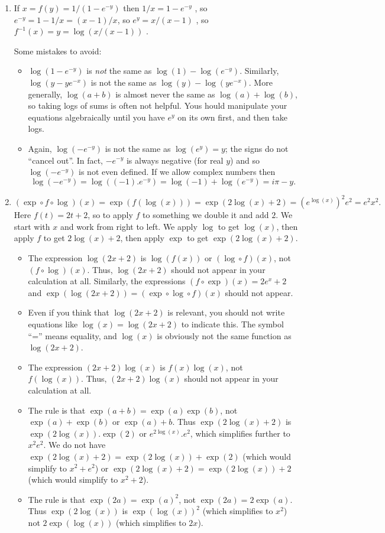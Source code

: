 \documentclass{amsart}
\renewcommand{\:}       {\colon}
\newcommand{\mk}        {}
\begin{document}
\begin{enumerate}
 \item %
  If $x=f(y)=1/(1-e^{-y})$ \mk then $1/x=1-e^{-y}$ \mk, so
  $e^{-y}=1-1/x=(x-1)/x$, so $e^y=x/(x-1)$ \mk, so
  $f^{-1}(x)=y=\log(x/(x-1))$ \mk. 

  Some mistakes to avoid:
  \begin{itemize}
   \item $\log(1-e^{-y})$ is \emph{not} the same as
    $\log(1)-\log(e^{-y})$.  Similarly, $\log(y-ye^{-x})$ is not the
    same as $\log(y)-\log(ye^{-x})$.  More generally, $\log(a+b)$ is
    almost never the same as $\log(a)+\log(b)$, so taking logs of sums
    is often not helpful.  Yous hould manipulate your equations
    algebraically until you have $e^y$ on its own first, and then take
    logs. 
   \item Again, $\log(-e^{-y})$ is not the same as $\log(e^y)=y$; the
    signs do not ``cancel out''.  In fact, $-e^{-y}$ is always
    negative (for real $y$) and so $\log(-e^{-y})$ is not even
    defined.  If we allow complex numbers then 
    \[ \log(-e^{-y}) = \log((-1).e^{-y}) = 
        \log(-1) + \log(e^{-y}) = i\pi - y.
    \]
  \end{itemize}

 \item %
  \[ (\exp\circ f\circ\log)(x) = \exp(f(\log(x))) \mk = 
      \exp(2\log(x)+2) \mk = (e^{\log(x)})^2 e^2 \mk = e^2x^2 \mk.
  \]
  Here $f(t)=2t+2$, so to apply $f$ to something we double it and add
  $2$.  We start with $x$ and work from right to left.  We apply
  $\log$ to get $\log(x)$, then apply $f$ to get $2\log(x)+2$, then
  apply $\exp$ to get $\exp(2\log(x)+2)$.  
  \begin{itemize}
   \item The expression $\log(2x+2)$ is $\log(f(x))$ or
    $(\log\circ f)(x)$, not $(f\circ\log)(x)$.  Thus, $\log(2x+2)$
    should not appear in your calculation at all.  Similarly, the
    expressions $(f\circ\exp)(x)=2e^x+2$ and
    $\exp(\log(2x+2))=(\exp\circ\log\circ f)(x)$ should not appear.
   \item Even if you think that $\log(2x+2)$ is relevant, you should
    not write equations like $\log(x)=\log(2x+2)$ to indicate this.
    The symbol ``='' means equality, and $\log(x)$ is obviously not
    the same function as $\log(2x+2)$.
   \item The expression $(2x+2)\log(x)$ is $f(x)\log(x)$, not
    $f(\log(x))$.  Thus, $(2x+2)\log(x)$ should not appear in your
    calculation at all.
   \item The rule is that $\exp(a+b)=\exp(a)\exp(b)$, not
    $\exp(a)+\exp(b)$ or $\exp(a)+b$.  Thus $\exp(2\log(x)+2)$ is
    $\exp(2\log(x)).\exp(2)$ or $e^{2\log(x)}.e^2$, which simplifies
    further to $x^2e^2$.  We do not have
    $\exp(2\log(x)+2)=\exp(2\log(x))+\exp(2)$ (which would simplify to
    $x^2+e^2$) or $\exp(2\log(x)+2)=\exp(2\log(x))+2$ (which would
    simplify to $x^2+2$).
   \item The rule is that $\exp(2a)=\exp(a)^2$, not
    $\exp(2a)=2\exp(a)$.  Thus $\exp(2\log(x))$ is $\exp(\log(x))^2$
    (which simplifies to $x^2$) not $2\exp(\log(x))$ (which simplifies
    to $2x$).
  \end{itemize}


\end{enumerate}
\end{document}

